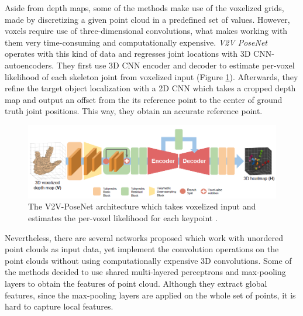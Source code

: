 \vspace{5mm}
\noindent Aside from depth maps, some of the methods make use of the voxelized grids, made by discretizing a given point cloud in a predefined set of values. However, voxels require use of three-dimensional convolutions, what makes working with them very time-consuming and computationally expensive. \textit{V2V PoseNet} \cite{DBLP:journals/corr/abs-1711-07399} operates with this kind of data and regresses joint locations with 3D CNN-autoencoders. They first use 3D CNN encoder and decoder to estimate per-voxel likelihood of each skeleton joint from voxelized input (Figure \ref{fig:v2vposenet}). Afterwards, they refine the target object localization with a 2D CNN which takes a cropped depth map and output an offset from the its reference point to the center of ground truth joint positions. This way, they obtain an accurate reference point.\par

\vspace{5mm}
\begin{figure}[H]
\begin{center}
  \includegraphics[width=\textwidth]{images/related_work/v2vposenet.PNG}
  \caption[The V2V-PoseNet architecture \cite{DBLP:journals/corr/abs-1711-07399}.]{The V2V-PoseNet architecture which takes voxelized input and estimates the per-voxel likelihood for each keypoint \cite{DBLP:journals/corr/abs-1711-07399}.}
  \label{fig:v2vposenet}
\end{center}
\end{figure}



\noindent Nevertheless, there are several networks proposed which work with unordered point clouds as input data, yet implement the convolution operations on the point clouds without using computationally expensive 3D convolutions. Some of the methods decided to use shared multi-layered perceptrons and max-pooling layers to obtain the features of point cloud. Although they extract global features, since the max-pooling layers are applied on the whole set of points, it is hard to capture local features.\par
\vspace{5mm}


